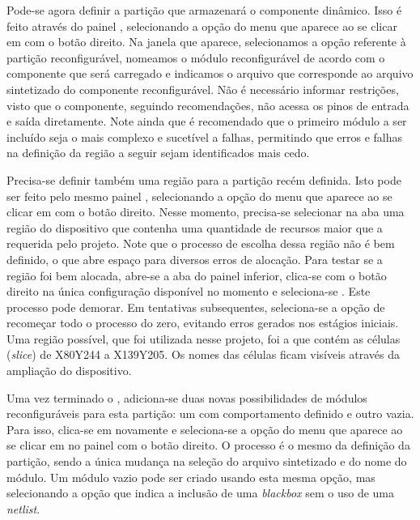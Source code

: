 \documentclass[11pt,a4paper,oneside]{book}
\begin{document}
Pode-se agora definir a partição que armazenará o componente dinâmico.
Isso é feito através do painel , selecionando a opção  do menu que aparece ao se clicar em  com o botão direito.
Na janela que aparece, selecionamos a opção referente à partição reconfigurável, nomeamos o módulo reconfigurável de acordo com o componente que será carregado e indicamos o arquivo que corresponde ao arquivo sintetizado do componente reconfigurável.
Não é necessário informar restrições, visto que o componente, seguindo recomendações, não acessa os pinos de entrada e saída diretamente.
Note ainda que é recomendado que o primeiro módulo a ser incluído seja o mais complexo e sucetível a falhas, permitindo que erros e falhas na definição da região a seguir sejam identificados mais cedo.

Precisa-se definir também uma região para a partição recém definida.
Isto pode ser feito pelo mesmo painel , selecionando a opção  do menu que aparece ao se clicar em  com o botão direito.
Nesse momento, precisa-se selecionar na aba  uma região do dispositivo que contenha uma quantidade de recursos maior que a requerida pelo projeto.
Note que o processo de escolha dessa região não é bem definido, o que abre espaço para diversos erros de alocação.
Para testar se a região foi bem alocada, abre-se a aba  do painel inferior, clica-se com o botão direito na única configuração disponível no momento e seleciona-se .
Este processo pode demorar.
Em tentativas subsequentes, seleciona-se a opção de recomeçar todo o processo do zero, evitando erros gerados nos estágios iniciais.
Uma região possível, que foi utilizada nesse projeto, foi a que contém as células (\textit{slice}) de X80Y244 a X139Y205.
Os nomes das células ficam visíveis através da ampliação do dispositivo.

Uma vez terminado o , adiciona-se duas novas possibilidades de módulos reconfiguráveis para esta partição: um com comportamento definido e outro vazia.
Para isso, clica-se em  novamente e seleciona-se a opção  do menu que aparece ao se clicar em  no painel  com o botão direito.
O processo é o mesmo da definição da partição, sendo a única mudança na seleção do arquivo sintetizado e do nome do módulo.
Um módulo vazio pode ser criado usando esta mesma opção, mas selecionando a opção que indica a inclusão de uma \textit{blackbox} sem o uso de uma \textit{netlist}.
\end{document}
